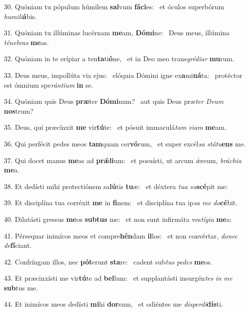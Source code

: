 30. Quóniam tu pópulum húmilem \textbf{sal}vum \textbf{fá}\textbf{ci}es: \ast\  et óculos superbórum \textit{hu}\textit{mi}\textit{li}\textbf{á}bis.\

31. Quóniam tu illúminas lucérnam \textbf{me}am, \textbf{Dó}\textbf{mi}ne: \ast\  Deus meus, illúmina \textit{té}\textit{ne}\textit{bras} \textbf{me}as.\

32. Quóniam in te erípiar a ten\textbf{ta}ti\textbf{ó}ne, \ast\  et in Deo meo trans\textit{gré}\textit{di}\textit{ar} \textbf{mu}rum.\

33. Deus meus, impollúta via ejus: \dag\  elóquia Dómini igne ex\textbf{a}mi\textbf{ná}ta: \ast\  protéctor est ómnium spe\textit{rán}\textit{ti}\textit{um} \textbf{in} se.\

34. Quóniam quis Deus \textbf{præ}ter \textbf{Dó}\textbf{mi}num? \ast\  aut quis Deus præ\textit{ter} \textit{De}\textit{um} \textbf{nos}trum?\

35. Deus, qui præcínxit \textbf{me} vir\textbf{tú}te: \ast\  et pósuit immaculá\textit{tam} \textit{vi}\textit{am} \textbf{me}am.\

36. Qui perfécit pedes meos \textbf{tam}quam cer\textbf{vó}rum, \ast\  et super excél\textit{sa} \textit{stá}\textit{tu}\textbf{ens} me.\

37. Qui docet manus \textbf{me}as ad \textbf{prǽ}\textbf{li}um: \ast\  et posuísti, ut arcum ǽreum, \textit{brá}\textit{chi}\textit{a} \textbf{me}a.\

38. Et dedísti mihi protectiónem sa\textbf{lú}tis \textbf{tu}æ: \ast\  et déxtera \textit{tu}\textit{a} \textit{su}\textbf{scé}pit me:\

39. Et disciplína tua corréxit \textbf{me} in \textbf{fi}nem: \ast\  et disciplína tua ip\textit{sa} \textit{me} \textit{do}\textbf{cé}bit.\

40. Dilatásti gressus \textbf{me}os \textbf{sub}\textbf{tus} me: \ast\  et non sunt infirmáta ves\textit{tí}\textit{gi}\textit{a} \textbf{me}a:\

41. Pérsequar inimícos meos et compre\textbf{hén}dam \textbf{il}los: \ast\  et non convértar, \textit{do}\textit{nec} \textit{de}\textbf{fí}ciant.\

42. Confríngam illos, nec \textbf{pót}erunt \textbf{sta}re: \ast\  cadent sub\textit{tus} \textit{pe}\textit{des} \textbf{me}os.\

43. Et præcinxísti me vir\textbf{tú}te ad \textbf{bel}lum: \ast\  et supplantásti insurgén\textit{tes} \textit{in} \textit{me} \textbf{sub}tus me.\

44. Et inimícos meos dedísti \textbf{mi}hi \textbf{dor}sum, \ast\  et odiéntes me \textit{dis}\textit{per}\textit{di}\textbf{dís}ti.\

